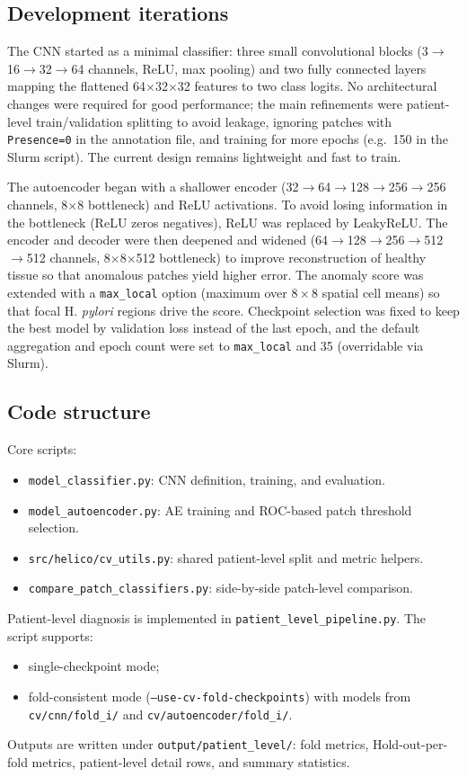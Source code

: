 \documentclass[11pt,a4paper]{article}
\begin{document}
\subsection{Development iterations}
The CNN started as a minimal classifier: three small convolutional blocks (3$\to$16$\to$32$\to$64 channels, ReLU, max pooling) and two fully connected layers mapping the flattened 64$\times$32$\times$32 features to two class logits. No architectural changes were required for good performance; the main refinements were patient-level train/validation splitting to avoid leakage, ignoring patches with \texttt{Presence=0} in the annotation file, and training for more epochs (e.g.\ 150 in the Slurm script). The current design remains lightweight and fast to train.

The autoencoder began with a shallower encoder (32$\to$64$\to$128$\to$256$\to$256 channels, 8$\times$8 bottleneck) and ReLU activations. To avoid losing information in the bottleneck (ReLU zeros negatives), ReLU was replaced by LeakyReLU. The encoder and decoder were then deepened and widened (64$\to$128$\to$256$\to$512$\to$512 channels, 8$\times$8$\times$512 bottleneck) to improve reconstruction of healthy tissue so that anomalous patches yield higher error. The anomaly score was extended with a \texttt{max\_local} option (maximum over $8\times8$ spatial cell means) so that focal H.\textit{ pylori} regions drive the score. Checkpoint selection was fixed to keep the best model by validation loss instead of the last epoch, and the default aggregation and epoch count were set to \texttt{max\_local} and 35 (overridable via Slurm).

\subsection{Code structure}
Core scripts:
\begin{itemize}
  \item \texttt{model\_classifier.py}: CNN definition, training, and evaluation.
  \item \texttt{model\_autoencoder.py}: AE training and ROC-based patch threshold selection.
  \item \texttt{src/helico/cv\_utils.py}: shared patient-level split and metric helpers.
  \item \texttt{compare\_patch\_classifiers.py}: side-by-side patch-level comparison.
\end{itemize}

Patient-level diagnosis is implemented in \texttt{patient\_level\_pipeline.py}. The script supports:
\begin{itemize}
  \item single-checkpoint mode;
  \item fold-consistent mode (\texttt{--use-cv-fold-checkpoints}) with models from \texttt{cv/cnn/fold\_i/} and \texttt{cv/autoencoder/fold\_i/}.
\end{itemize}
Outputs are written under \texttt{output/patient\_level/}: fold metrics, Hold-out-per-fold metrics, patient-level detail rows, and summary statistics.
\end{document}
